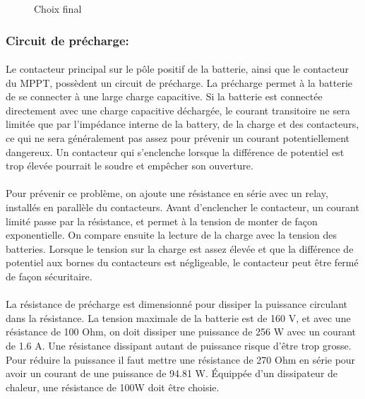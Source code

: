 		\begin{figure}[H]
			\centering
			\caption[Choix final]{Choix final}
			\label{fig:contactorsolfinal}
		\end{figure}
		


	\subsubsection*{Circuit de précharge:}
		\paragraph*{}
		Le contacteur principal sur le pôle positif de la batterie, ainsi que le contacteur du MPPT, possèdent un circuit de précharge. La précharge permet à la batterie de se connecter à une large charge capacitive. Si la batterie est connectée directement avec une charge capacitive déchargée, le courant transitoire ne sera limitée que par l'impédance interne de la battery, de la charge et des contacteurs, ce qui ne sera généralement pas assez pour prévenir un courant potentiellement dangereux. Un contacteur qui s'enclenche lorsque la différence de potentiel est trop élevée pourrait le soudre et empêcher son ouverture.
		
		\paragraph*{}
		Pour prévenir ce problème, on ajoute une résistance en série avec un relay, installés en parallèle du contacteurs. Avant d'enclencher le contacteur, un courant limité passe par la résistance, et permet à la tension de monter de façon exponentielle. On compare ensuite la lecture de la charge avec la tension des batteries. Lorsque le tension sur la charge est assez élevée et que la différence de potentiel aux bornes du contacteurs est négligeable, le contacteur peut être fermé de façon sécuritaire.
		

		
		\paragraph*{}		
		La résistance de précharge est dimensionné pour dissiper la puissance circulant dans la résistance. La tension maximale de la batterie est de 160 V, et avec une résistance de 100 Ohm, on doit dissiper une puissance de 256 W avec un courant de 1.6 A. Une résistance dissipant autant de puissance risque d'être trop grosse. Pour réduire la puissance il faut mettre une résistance de 270 Ohm en série pour avoir un courant de une puissance de 94.81 W. Équippée d'un dissipateur de chaleur, une résistance de 100W doit être choisie.
		
